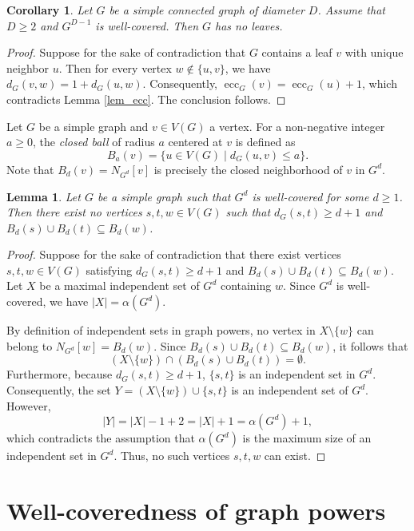 \documentclass[12pt]{amsart}
\numberwithin{equation}{section}
\newtheorem{lem}[thm]{\bf Lemma}
\newtheorem{cor}[thm]{\bf Corollary}
\theoremstyle{definition}
\begin{document}
\begin{cor}
Let $G$ be a simple connected graph of diameter $D$. Assume that $D \ge 2$ and $G^{D-1}$ is well-covered. Then $G$ has no leaves.
\end{cor}

\begin{proof}
Suppose for the sake of contradiction that $G$ contains a leaf $v$ with unique neighbor $u$. Then for every vertex $w \notin \{u, v\}$, we have $d_G(v, w) = 1 + d_G(u, w)$. Consequently, $\operatorname{ecc}_G(v) = \operatorname{ecc}_G(u) + 1$, which contradicts Lemma \ref{lem_ecc}. The conclusion follows.
\end{proof}

Let $G$ be a simple graph and $v \in V(G)$ a vertex. For a non-negative integer $a \ge 0$, the \emph{closed ball} of radius $a$ centered at $v$ is defined as 
\[
B_a(v) = \{u \in V(G) \mid d_G(u,v) \le a\}.
\]
Note that $B_d(v) = N_{G^d}[v]$ is precisely the closed neighborhood of $v$ in $G^d$.

\begin{lem}\label{lem_d2}
Let $G$ be a simple graph such that $G^d$ is well-covered for some $d \ge 1$. Then there exist no vertices $s, t, w \in V(G)$ such that $d_G(s,t) \ge d+1$ and $B_d(s) \cup B_d(t) \subseteq B_d(w)$.
\end{lem}

\begin{proof}
Suppose for the sake of contradiction that there exist vertices $s, t, w \in V(G)$ satisfying $d_G(s,t) \ge d+1$ and $B_d(s) \cup B_d(t) \subseteq B_d(w)$. Let $X$ be a maximal independent set of $G^d$ containing $w$. Since $G^d$ is well-covered, we have $|X| = \alpha(G^d)$.

By definition of independent sets in graph powers, no vertex in $X \setminus \{w\}$ can belong to $N_{G^d}[w] = B_d(w)$. Since $B_d(s) \cup B_d(t) \subseteq B_d(w)$, it follows that 
\[
(X \setminus \{w\}) \cap (B_d(s) \cup B_d(t)) = \emptyset.
\]
Furthermore, because $d_G(s,t) \ge d+1$, $\{s, t\}$ is an independent set in $G^d$. Consequently, the set $Y = (X \setminus \{w\}) \cup \{s, t\}$ is an independent set of $G^d$. However, 
\[
|Y| = |X| - 1 + 2 = |X| + 1 = \alpha(G^d) + 1,
\]
which contradicts the assumption that $\alpha(G^d)$ is the maximum size of an independent set in $G^d$. Thus, no such vertices $s, t, w$ can exist.
\end{proof}

\section{Well-coveredness of graph powers}\label{sec_mains}
\end{document}
